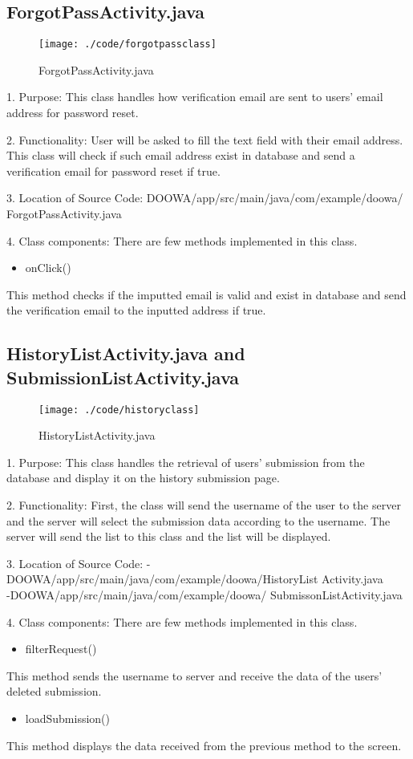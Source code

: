 \documentclass[conference]{IEEEtran}
\begin{document}
\subsection{ForgotPassActivity.java}
\begin{figure}[h!]
\texttt{[image: ./code/forgotpassclass]}
\centering
\caption{ForgotPassActivity.java}
\end{figure}
1. Purpose: This class handles how verification email are sent to users' email address for password reset.\break
\par 2. Functionality: User will be asked to fill the text field with their email address. This class will check if such email address exist in database and send a verification email for password reset if true.\break

3. Location of Source Code: DOOWA/app/src/main/java/com/example/doowa/ ForgotPassActivity.java\break

4. Class components: There are few methods implemented in this class.
\begin{itemize}
\item onClick()
\end{itemize}
This method checks if the imputted email is valid and exist in database and send the verification email to the inputted address if true.
\break
\subsection{HistoryListActivity.java and SubmissionListActivity.java}
\begin{figure}[h!]
\texttt{[image: ./code/historyclass]}
\centering
\caption{HistoryListActivity.java}
\end{figure}
1. Purpose: This class handles the retrieval of users' submission from the database and display it on the history submission page.\break
\par 2. Functionality: First, the class will send the username of the user to the server and the server will select the submission data according to the username. The server will send the list to this class and the list will be displayed.\break

3. Location of Source Code: -DOOWA/app/src/main/java/com/example/doowa/HistoryList Activity.java\\
-DOOWA/app/src/main/java/com/example/doowa/ SubmissonListActivity.java
\break

4. Class components: There are few methods implemented in this class.
\begin{itemize}
\item filterRequest()
\end{itemize}
This method sends the username to server and receive the data of the users' deleted submission.
\begin{itemize}
\item loadSubmission()
\end{itemize}
This method displays the data received from the previous method to the screen.
\break
\end{document}
